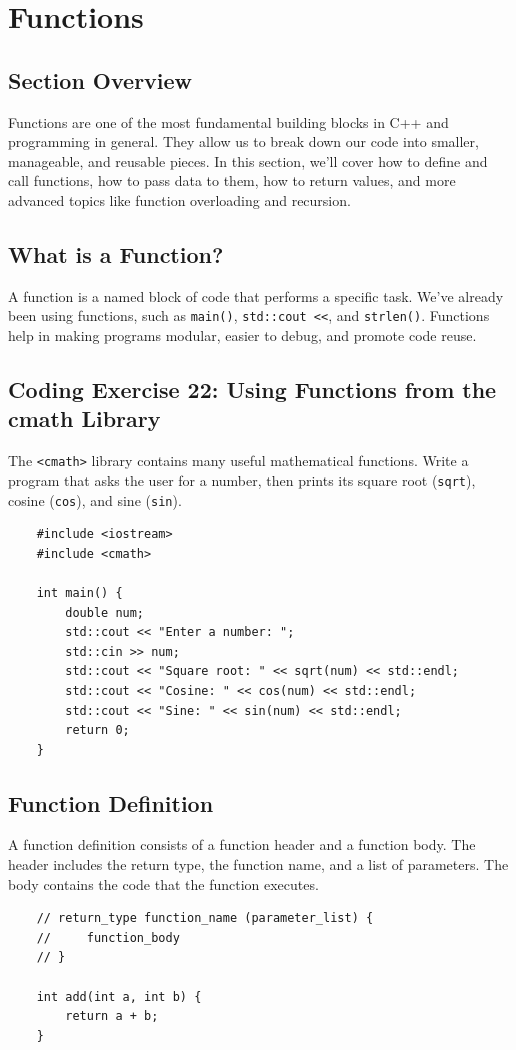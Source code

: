 \section{Functions}

\subsection{Section Overview}
Functions are one of the most fundamental building blocks in C++ and programming in general. They allow us to break down our code into smaller, manageable, and reusable pieces. In this section, we'll cover how to define and call functions, how to pass data to them, how to return values, and more advanced topics like function overloading and recursion.

\subsection{What is a Function?}
A function is a named block of code that performs a specific task. We've already been using functions, such as \texttt{main()}, \texttt{std::cout <<}, and \texttt{strlen()}. Functions help in making programs modular, easier to debug, and promote code reuse.

\subsection{Coding Exercise 22: Using Functions from the cmath Library}
The \texttt{<cmath>} library contains many useful mathematical functions. Write a program that asks the user for a number, then prints its square root (\texttt{sqrt}), cosine (\texttt{cos}), and sine (\texttt{sin}).
\begin{lstlisting}
	#include <iostream>
	#include <cmath>

	int main() {
		double num;
		std::cout << "Enter a number: ";
		std::cin >> num;
		std::cout << "Square root: " << sqrt(num) << std::endl;
		std::cout << "Cosine: " << cos(num) << std::endl;
		std::cout << "Sine: " << sin(num) << std::endl;
		return 0;
	}
\end{lstlisting}

\subsection{Function Definition}
A function definition consists of a function header and a function body. The header includes the return type, the function name, and a list of parameters. The body contains the code that the function executes.
\begin{lstlisting}
	// return_type function_name (parameter_list) {
	//     function_body
	// }

	int add(int a, int b) {
		return a + b;
	}
\end{lstlisting}

